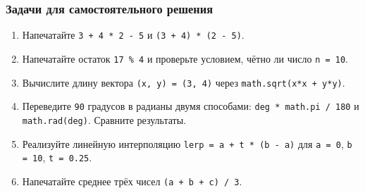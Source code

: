 \subsubsection*{Задачи для самостоятельного решения}
\begin{enumerate}
  \item Напечатайте \verb|3 + 4 * 2 - 5| и \verb|(3 + 4) * (2 - 5)|.
  \item Напечатайте остаток \verb|17 % 4| и проверьте условием, чётно ли число \verb|n = 10|.
  \item Вычислите длину вектора \verb|(x, y) = (3, 4)| через \verb|math.sqrt(x*x + y*y)|.
  \item Переведите \verb|90| градусов в радианы двумя способами: \verb|deg * math.pi / 180| и \verb|math.rad(deg)|. Сравните результаты.
  \item Реализуйте линейную интерполяцию \verb|lerp = a + t * (b - a)| для \verb|a = 0|, \verb|b = 10|, \verb|t = 0.25|.
  \item Напечатайте среднее трёх чисел \verb|(a + b + c) / 3|.
\end{enumerate}
